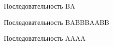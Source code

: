 \documentclass[a5paper,10pt, twoside]{article} %
\begin{document}
  \begin{center}
    \begin{figure}[h!]
        \caption{Последовательность BA}
    \end{figure}
  \end{center}

\newpage

  \begin{center}
    \begin{figure}[h!]
        \caption{Последовательность BABBBAABB}
    \end{figure}
  \end{center}
  
    \begin{center}
    \begin{figure}[h!]
        \caption{Последовательность AAAA}
    \end{figure}
  \end{center}
\end{document}
